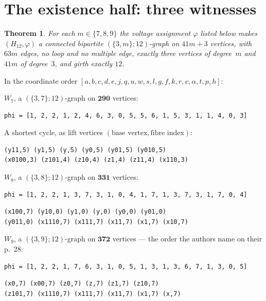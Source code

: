 \documentclass[11pt]{amsart}
\newtheorem{theorem}{Theorem}
\theoremstyle{remark}
\begin{document}
\section{The existence half: three witnesses}\label{sec:exist}

\begin{theorem}\label{thm:exist}
For each $m\in\{7,8,9\}$ the voltage assignment $\varphi$ listed below makes $(H_{12},\varphi)$
a connected bipartite $(\{3,m\};12)$-graph on $41m+3$ vertices, with $63m$ edges, no loop and
no multiple edge, exactly three vertices of degree~$m$ and $41m$ of degree~$3$, and girth
exactly $12$.
\end{theorem}

\noindent In the coordinate order $[a,b,c,d,e,j,q,u,w,s,l,g,f,k,r,v,\alpha,t,p,h]$:

\medskip
\noindent$W_7$, a $(\{3,7\};12)$-graph on $\mathbf{290}$ vertices:
{\small
\begin{verbatim}
phi = [1, 2, 2, 1, 2, 4, 6, 3, 0, 5, 5, 6, 1, 5, 3, 1, 1, 4, 0, 3]
\end{verbatim}}
\noindent A shortest cycle, as lift vertices $(\text{base vertex},\text{fibre index})$:
{\small
\begin{verbatim}
(y11,5) (y1,5) (y,5) (y0,5) (y01,5) (y010,5)
(x0100,3) (z101,4) (z10,4) (z1,4) (z11,4) (x110,3)
\end{verbatim}}

\noindent$W_8$, a $(\{3,8\};12)$-graph on $\mathbf{331}$ vertices:
{\small
\begin{verbatim}
phi = [1, 2, 2, 1, 3, 7, 3, 1, 0, 4, 1, 7, 1, 3, 7, 3, 1, 7, 0, 4]
\end{verbatim}}
{\small
\begin{verbatim}
(x100,7) (y10,0) (y1,0) (y,0) (y0,0) (y01,0)
(y011,0) (x1110,7) (x111,7) (x11,7) (x1,7) (x10,7)
\end{verbatim}}

\noindent$W_9$, a $(\{3,9\};12)$-graph on $\mathbf{372}$ vertices --- the order the authors name
on their p.~28:
{\small
\begin{verbatim}
phi = [1, 2, 2, 1, 7, 6, 3, 1, 0, 5, 1, 3, 1, 3, 6, 7, 1, 3, 0, 5]
\end{verbatim}}
{\small
\begin{verbatim}
(x0,7) (x00,7) (z0,7) (z,7) (z1,7) (z10,7)
(z101,7) (x1110,7) (x111,7) (x11,7) (x1,7) (x,7)
\end{verbatim}}
\end{document}
